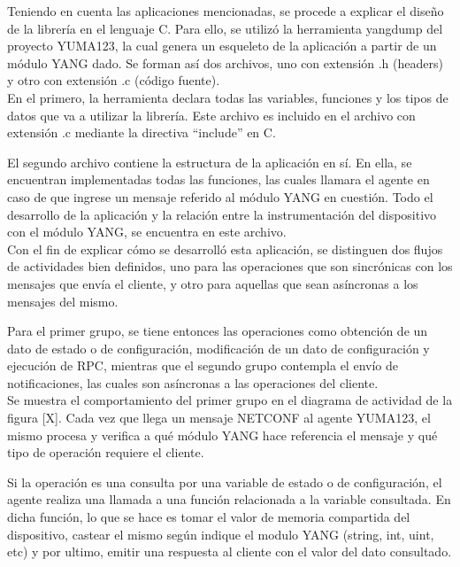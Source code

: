   Teniendo en cuenta las aplicaciones mencionadas, se procede a explicar el diseño de la librería en el lenguaje C. Para ello, se utilizó la herramienta yangdump del proyecto YUMA123, la cual genera un esqueleto de la aplicación a partir de un módulo YANG dado. Se forman así dos archivos, uno con extensión .h (headers) y otro con extensión .c (código fuente). 
  \\

  En el primero, la herramienta declara todas las variables, funciones y los tipos de datos que va a utilizar la librería. Este archivo es incluido en el archivo con extensión .c mediante la directiva “include” en C.

  El segundo archivo contiene la estructura de la aplicación en sí. En ella, se encuentran implementadas todas las funciones, las cuales llamara el agente en caso de que ingrese un mensaje referido al módulo YANG en cuestión. Todo el desarrollo de la aplicación y la relación entre la instrumentación del dispositivo con el módulo YANG, se encuentra en este archivo. 
  \\

  Con el fin de explicar cómo se desarrolló esta aplicación, se distinguen dos flujos de actividades bien definidos, uno para las operaciones que son sincrónicas con los mensajes que envía el cliente, y otro para aquellas que sean asíncronas a los mensajes del mismo. 

  Para el primer grupo, se tiene entonces las operaciones como obtención de un dato de estado o de configuración, modificación de un dato de configuración y ejecución de RPC, mientras que el segundo grupo contempla el envío de notificaciones, las cuales son asíncronas a las operaciones del cliente.
  \\

  Se muestra el comportamiento del primer grupo en el diagrama de actividad de la figura [X]. Cada vez que llega un mensaje NETCONF al agente YUMA123, el mismo procesa y verifica a qué módulo YANG hace referencia el mensaje y qué tipo de operación requiere el cliente. 

  Si la operación es una consulta por una variable de estado o de configuración, el agente realiza una llamada a una función relacionada a la variable consultada. En dicha función, lo que se hace es tomar el valor de memoria compartida del dispositivo, castear el mismo según indique el modulo YANG (string, int, uint, etc) y por ultimo, emitir una respuesta al cliente con el valor del dato consultado.

